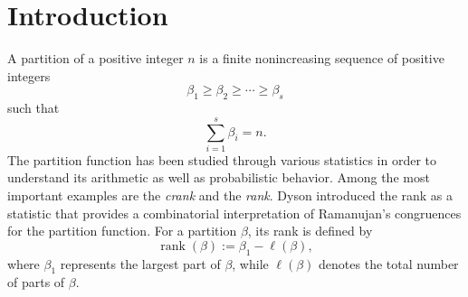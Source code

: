 \documentclass[12pt,oneside,reqno]{amsart}
\numberwithin{equation}{section}
\begin{document}
	\maketitle
	\section{Introduction}
	A partition of a positive integer $n$ is a finite nonincreasing sequence 
	of positive integers 
	\[ 
	\beta_1\geq\beta_2\geq\cdots\geq\beta_s 
	\] 
	such that 
	\[ 
	\sum_{i=1}^{s}\beta_i=n. 
	\] 
The partition function has been studied through various statistics in 
order to understand its arithmetic as well as probabilistic behavior. 
Among the most important examples are the \emph{crank} and the 
\emph{rank}. Dyson \cite{Dyson1944} introduced the rank as a statistic that 
provides a combinatorial interpretation of Ramanujan's congruences for 
the partition function. For a partition $\beta$, its rank is defined 
by 
\[ 
\operatorname{rank}(\beta):=\beta_1-\ell(\beta), 
\] 
where $\beta_1$ represents the largest part of $\beta$, while 
$\ell(\beta)$ denotes the total number of parts of $\beta$. 
\end{document}

